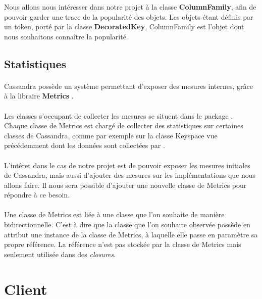 \documentclass[12pt]{article}
\begin{document}
Nous allons nous intéresser dans notre projet à la classe \textbf{ColumnFamily}, afin de pouvoir garder une trace de la popularité des objets. Les objets étant définis par un token, porté par la classe \textbf{DecoratedKey}, ColumnFamily est l'objet dont nous souhaitons connaître la popularité.

\subsection{Statistiques}

\paragraph{} Cassandra possède un système permettant d'exposer des mesures internes, grâce à la libraire \textbf{Metrics} \cite{Metrics2010}.

\paragraph{} Les classes s'occupant de collecter les mesures se situent dans le package . Chaque classe de Metrics est chargé de collecter des statistiques sur certaines classes de Cassandra, comme par exemple sur la classe Keyspace vue précédemment dont les données sont collectées par .

\paragraph{} L'intêret dans le cas de notre projet est de pouvoir exposer les mesures initiales de Cassandra, mais aussi d'ajouter des mesures sur les implémentations que nous allons faire. Il nous sera possible d'ajouter une nouvelle classe de Metrics pour répondre à ce besoin.

\paragraph{} Une classe de Metrics est liée à une classe que l'on souhaite de manière bidirectionnelle. C'est à dire que la classe que l'on souhaite observée possède en attribut une instance de la classe de Metrics, à laquelle elle passe en paramètre sa propre référence. La référence n'est pas stockée par la classe de Metrics mais seulement utilisée dans des \textit{closures}.


\newpage

\section{Client}
\end{document}
